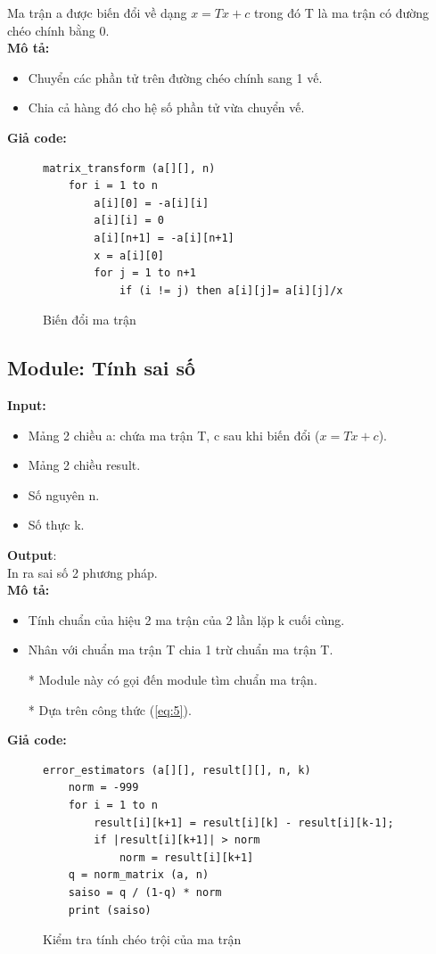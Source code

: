 \documentclass[twoside]{report2}
\begin{document}
\quad Ma trận a được biến đổi về dạng $x = Tx + c$ trong đó T là ma trận có đường chéo chính bằng 0.\\

\textbf{Mô tả:}
\begin{itemize}
\item Chuyển các phần tử trên đường chéo chính sang 1 vế.
\item Chia cả hàng đó cho hệ số phần tử vừa chuyển vế.
\end{itemize}

\textbf{Giả code:}
\begin{figure}[h]
\begin{lstlisting}[frame=single]
matrix_transform (a[][], n)
    for i = 1 to n
        a[i][0] = -a[i][i]
        a[i][i] = 0
        a[i][n+1] = -a[i][n+1]
        x = a[i][0]
        for j = 1 to n+1
            if (i != j) then a[i][j]= a[i][j]/x
\end{lstlisting}
\caption{Biến đổi ma trận}
\end{figure}

\newpage
\subsection{Module: Tính sai số}
\textbf{Input:}
\begin{itemize}
\item Mảng 2 chiều a: chứa ma trận T, c sau khi biến đổi ($x = Tx + c$).
\item Mảng 2 chiều result.
\item Số nguyên n.
\item Số thực k.
\end{itemize}
\textbf{Output}:\\

\quad In ra sai số 2 phương pháp.\\

\textbf{Mô tả:}
\begin{itemize}
\item Tính chuẩn của hiệu 2 ma trận của 2 lần lặp k cuối cùng.
\item Nhân với chuẩn ma trận T chia 1 trừ chuẩn ma trận T.
\item[*] Module này có gọi đến module tìm chuẩn ma trận.
\item[*] Dựa trên công thức (\ref{eq:5}).
\end{itemize}

\textbf{Giả code:}
\begin{figure}[h]
\begin{lstlisting}[frame=single]
error_estimators (a[][], result[][], n, k)
	norm = -999
    for i = 1 to n
        result[i][k+1] = result[i][k] - result[i][k-1];
        if |result[i][k+1]| > norm
            norm = result[i][k+1]
    q = norm_matrix (a, n)
    saiso = q / (1-q) * norm
    print (saiso)
\end{lstlisting}
\caption{Kiểm tra tính chéo trội của ma trận}
\end{figure}
\end{document}
